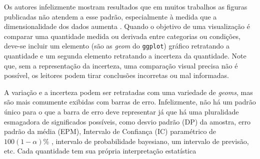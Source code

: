 \documentclass[article]{memoir}
\begin{document}
Os autores infelizmente mostram resultados que em muitos trabalhos as figuras publicadas não atendem a esse padrão, especialmente à medida que a dimensionalidade dos dados aumenta \cite{allen2012data}. Quando o objetivo de uma visualização é comparar uma quantidade medida ou derivada entre categorias ou condições, deve-se incluir um elemento (são as \textit{geom} do \texttt{ggplot}) gráfico retratando a quantidade e um segunda elemento  retratando a incerteza da quantidade. Note que, sem a representação da incerteza, uma comparação visual precisa não é possível, os leitores podem tirar conclusões incorretas ou mal informadas.

A variação e a incerteza podem ser retratadas com uma variedade de \textit{geoms}, mas são mais comumente exibidas com barras de erro. Infelizmente, não há um padrão único para o que a barra de erro deve representar já que há uma pluralidade esmagadora de significados possíveis, como desvio padrão (DP) da amostra, erro padrão da média (EPM), Intervalo de Confiança (IC) paramétrico de $100(1 − \alpha)\%$ , intervalo de probabilidade bayesiano, um intervalo de previsão, etc. Cada quantidade tem sua própria interpretação estatística
\end{document}

